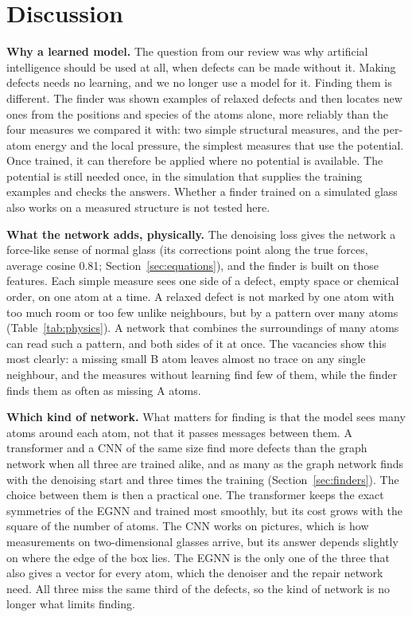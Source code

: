 \documentclass[10pt]{article}
\newif\iffinders
\begin{document}
\section{Discussion}

\textbf{Why a learned model.} The question from our review was why artificial intelligence should be used at all, when defects can be made without it. Making defects needs no learning, and we no longer use a model for it. Finding them is different. The finder was shown examples of relaxed defects and then locates new ones from the positions and species of the atoms alone, more reliably than the four measures we compared it with: two simple structural measures, and the per-atom energy and the local pressure, the simplest measures that use the potential. Once trained, it can therefore be applied where no potential is available. The potential is still needed once, in the simulation that supplies the training examples and checks the answers. Whether a finder trained on a simulated glass also works on a measured structure is not tested here.

\textbf{What the network adds, physically.} The denoising loss gives the network a force-like sense of normal glass (its corrections point along the true forces, average cosine 0.81; Section~\ref{sec:equations}), and the finder is built on those features. Each simple measure sees one side of a defect, empty space or chemical order, on one atom at a time. A relaxed defect is not marked by one atom with too much room or too few unlike neighbours, but by a pattern over many atoms (Table~\ref{tab:physics}). A network that combines the surroundings of many atoms can read such a pattern, and both sides of it at once. The vacancies show this most clearly: a missing small B atom leaves almost no trace on any single neighbour, and the measures without learning find few of them, while the finder finds them as often as missing A atoms.

\iffinders
\textbf{Which kind of network.} What matters for finding is that the model sees many atoms around each atom, not that it passes messages between them. A transformer and a CNN of the same size find more defects than the graph network when all three are trained alike, and as many as the graph network finds with the denoising start and three times the training (Section~\ref{sec:finders}). The choice between them is then a practical one. The transformer keeps the exact symmetries of the EGNN and trained most smoothly, but its cost grows with the square of the number of atoms. The CNN works on pictures, which is how measurements on two-dimensional glasses arrive, but its answer depends slightly on where the edge of the box lies. The EGNN is the only one of the three that also gives a vector for every atom, which the denoiser and the repair network need. All three miss the same third of the defects, so the kind of network is no longer what limits finding.
\end{document}
